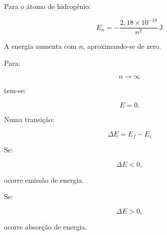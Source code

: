\documentclass[11pt,a4paper]{article}
\begin{document}
	\begin{recorda}
		
		Para o átomo de hidrogénio:
		
		\[
		\boxed{
			E_n=
			-\frac{2,18\times10^{-18}}{n^2}
			\ \mathrm{J}
		}
		\]
		
		A energia aumenta com \(n\), aproximando-se de zero.
		
		Para:
		
		\[
		n\rightarrow\infty
		\]
		
		tem-se:
		
		\[
		E=0.
		\]
		
		Numa transição:
		
		\[
		\boxed{
			\Delta E=E_f-E_i
		}
		\]
		
		Se:
		
		\[
		\Delta E<0,
		\]
		
		ocorre emissão de energia.
		
		Se:
		
		\[
		\Delta E>0,
		\]
		
		ocorre absorção de energia.
		
	\end{recorda}
	
	
\end{document}
